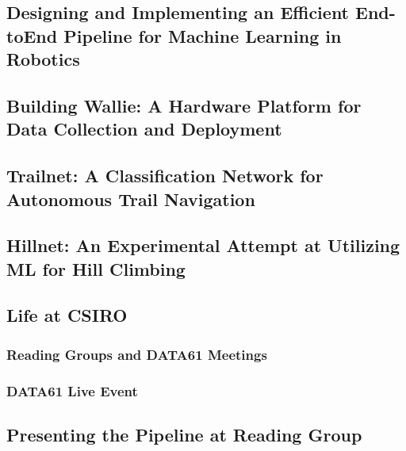 

\subsection{Designing and Implementing an Efficient End-toEnd Pipeline for Machine Learning in Robotics}

\newpage
\subsection{Building Wallie: A Hardware Platform for Data Collection and Deployment}

\newpage
\subsection{Trailnet: A Classification Network for Autonomous Trail Navigation}

\newpage
\subsection{Hillnet: An Experimental Attempt at Utilizing ML for Hill Climbing}

\newpage
\subsection{Life at CSIRO}

\subsubsection{Reading Groups and DATA61 Meetings}

\subsubsection{DATA61 Live Event}

\newpage
\subsection{Presenting the Pipeline at Reading Group}

